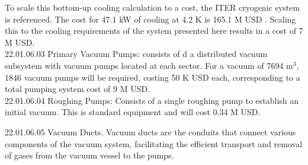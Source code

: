 To scale this bottom-up cooling calculation to a cost, the ITER cryogenic system is referenced. The cost for 47.1 kW of cooling at 4.2 K is 165.1 M USD \cite{waganer2006design, serio2010challenges}. Scaling this to the cooling requirements of the system presented here results in a cost of 7 M USD. \\

22.01.06.03 Primary Vacuum Pumps: consists of d a distributed vacuum subsystem with vacuum pumps located at each sector. For a vacuum of 7694 m$^3$, 1846 vacuum pumps will be required, costing 50 K USD each, corresponding to a total pumping system cost of 9 M USD.\\

22.01.06.04 Roughing Pumps: Consists of a single roughing pump to establish an initial vacuum. This is standard equipment and will cost 0.34 M USD.

22.01.06.05 Vacuum Ducts. Vacuum ducts are the conduits that connect various components of the vacuum system, facilitating the efficient transport and removal of gases from the vacuum vessel to the pumps.